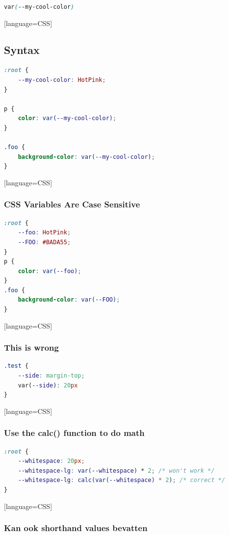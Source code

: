 \documentclass{article}
\begin{document}
\begin{lstlisting}[language=CSS]
var(--my-cool-color)
\end{lstlisting}[language=CSS]

\subsection{Syntax}

\begin{lstlisting}[language=CSS]
:root {
    --my-cool-color: HotPink;
}

p {
    color: var(--my-cool-color);
}

.foo {
    background-color: var(--my-cool-color);
}
\end{lstlisting}[language=CSS]

\subsubsection{CSS Variables Are Case Sensitive}

\begin{lstlisting}[language=CSS]
:root {
    --foo: HotPink;
    --FOO: #BADA55;
}
p {
    color: var(--foo);
}
.foo {
    background-color: var(--FOO);
}
\end{lstlisting}[language=CSS]


\subsubsection{This is wrong}

\begin{lstlisting}[language=CSS]
.test {
    --side: margin-top;
    var(--side): 20px
}
\end{lstlisting}[language=CSS]

\subsubsection{Use the calc() function to do math}

\begin{lstlisting}[language=CSS]
:root {
    --whitespace: 20px;
    --whitespace-lg: var(--whitespace) * 2; /* won't work */
    --whitespace-lg: calc(var(--whitespace) * 2); /* correct */
}
\end{lstlisting}[language=CSS]

\subsubsection{Kan ook shorthand values bevatten}
\end{document}
